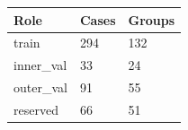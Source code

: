 \begin{tabular}{lll}
\toprule
Role & Cases & Groups \\
\midrule
train & 294 & 132 \\
inner\_val & 33 & 24 \\
outer\_val & 91 & 55 \\
reserved & 66 & 51 \\
\bottomrule
\end{tabular}
